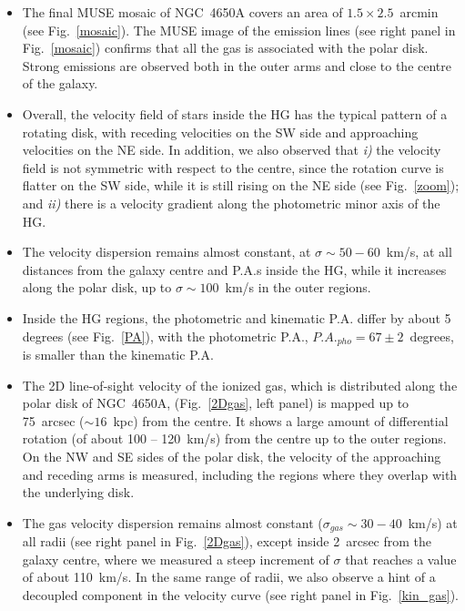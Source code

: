 \documentclass{aa}
\begin{document}
\begin{itemize}

\item The final MUSE mosaic of NGC~4650A covers an area of
  $1.5 \times 2.5$~arcmin (see Fig.~\ref{mosaic}).  The MUSE image of
  the emission lines (see right panel in Fig.~\ref{mosaic}) confirms
  that  all the gas is  associated with the polar disk. Strong emissions are observed both in
  the outer arms and close to the centre of the galaxy.

\item  Overall, the velocity field of stars inside the HG has the
    typical pattern of a rotating disk, with receding velocities on
    the SW side and approaching velocities on the NE side. 
    In addition, we also observed that {\it i)} the velocity field is  not symmetric with respect to the centre, since the rotation curve   is flatter on the SW side, while it is still rising on the NE side
    (see Fig.~\ref{zoom}); and {\it ii)} there is a velocity gradient along the photometric minor axis of the HG.

\item  The velocity dispersion remains  almost constant, at
    $\sigma \sim 50 - 60$~km/s, at all distances from the galaxy
    centre and P.A.s inside the HG, while it increases along the polar
    disk, up to $\sigma \sim 100$~km/s in the outer regions.

\item Inside the HG regions, the photometric and kinematic
  P.A.  differ by about 5 degrees (see Fig.~\ref{PA}), with the
  photometric P.A., $P.A._{pho}=67 \pm 2$~degrees, is smaller than the
  kinematic P.A. 

\item  The 2D line-of-sight velocity of the ionized
    gas, which is distributed along the polar disk of NGC~4650A,
    (Fig.~\ref{2Dgas}, left panel) is mapped up to 75~arcsec
    ($\sim 16$~kpc) from the centre. It shows a large amount of
    differential rotation (of about 100 -- 120~km/s) from the centre
    up to the outer regions. On the NW and SE sides of the polar disk,
    the velocity of the approaching and receding arms is measured,
    including the regions where they overlap with the underlying disk. 

\item The gas velocity dispersion remains almost constant
  ($\sigma_{gas} \sim 30 - 40$~km/s) at all radii (see right panel in  Fig.~\ref{2Dgas}), except inside 2~arcsec from the galaxy centre,
  where we measured a steep increment of $\sigma$ that reaches a value
  of about 110~km/s. In the same range of radii, we also observe a
  hint of a decoupled component in the velocity curve (see right
  panel in Fig.~\ref{kin_gas}).

\end{itemize}
\end{document}
